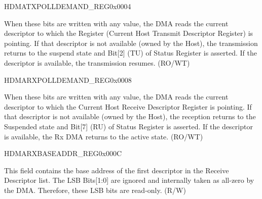 \begin{register}{H}{DMATXPOLLDEMAND\_REG}{0x0004}\label{regdesc:DMATXPOLLDEMANDREG}
%
\regnewline%
\begin{regdesc}\begin{reglist}
\item [TRANS\_POLL\_DEMAND]When these bits are written with any value, the DMA reads the current descriptor to which the Register (Current Host Transmit Descriptor Register) is pointing. If that descriptor is not available (owned by the Host), the transmission returns to the suspend state and Bit[2] (TU) of Status Register is asserted. If the descriptor is available, the transmission resumes. (RO/WT)
\end{reglist}\end{regdesc}
\end{register}


\begin{register}{H}{DMARXPOLLDEMAND\_REG}{0x0008}\label{regdesc:DMARXPOLLDEMANDREG}
%
\regnewline%
\begin{regdesc}\begin{reglist}
\item [RECV\_POLL\_DEMAND]When these bits are written with any value, the DMA reads the current descriptor to which the Current Host Receive Descriptor Register is pointing. If that descriptor is not available (owned by the Host), the reception returns to the Suspended state and Bit[7] (RU) of Status Register is asserted. If the descriptor is available, the Rx DMA returns to the active state. (RO/WT)
\end{reglist}\end{regdesc}
\end{register}


\begin{register}{H}{DMARXBASEADDR\_REG}{0x000C}\label{regdesc:DMARXBASEADDRREG}
%
\regnewline%
\begin{regdesc}\begin{reglist}
\item [START\_RECV\_LIST]This field contains the base address of the first descriptor in the Receive Descriptor list. The LSB Bits[1:0] are ignored and internally taken as all-zero by the DMA. Therefore, these LSB bits are read-only. (R/W)
\end{reglist}\end{regdesc}
\end{register}


